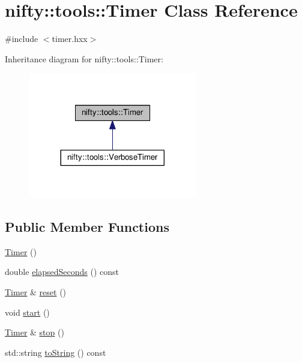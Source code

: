 \hypertarget{classnifty_1_1tools_1_1Timer}{}\section{nifty\+:\+:tools\+:\+:Timer Class Reference}
\label{classnifty_1_1tools_1_1Timer}


{\ttfamily \#include $<$timer.\+hxx$>$}



Inheritance diagram for nifty\+:\+:tools\+:\+:Timer\+:\nopagebreak
\begin{figure}[H]
\begin{center}
\leavevmode
\includegraphics[width=209pt]{classnifty_1_1tools_1_1Timer__inherit__graph}
\end{center}
\end{figure}
\subsection*{Public Member Functions}
\begin{DoxyCompactItemize}
\item 
\hyperlink{classnifty_1_1tools_1_1Timer_afcb5547e9eb4e28f853f1719a8441f13}{Timer} ()
\item 
double \hyperlink{classnifty_1_1tools_1_1Timer_a6851719aee1a9c0180a640a7b6183f4d}{elapsed\+Seconds} () const 
\item 
\hyperlink{classnifty_1_1tools_1_1Timer}{Timer} \& \hyperlink{classnifty_1_1tools_1_1Timer_a6cfa990f8398a8dfd00810d3b0d6f526}{reset} ()
\item 
void \hyperlink{classnifty_1_1tools_1_1Timer_a0167833955c7125f150098b40bd9cdff}{start} ()
\item 
\hyperlink{classnifty_1_1tools_1_1Timer}{Timer} \& \hyperlink{classnifty_1_1tools_1_1Timer_ac45248ef59cb5b742566fde4f64ddada}{stop} ()
\item 
std\+::string \hyperlink{classnifty_1_1tools_1_1Timer_a877631a1c97b6fad48908489df6efe13}{to\+String} () const 
\end{DoxyCompactItemize}


